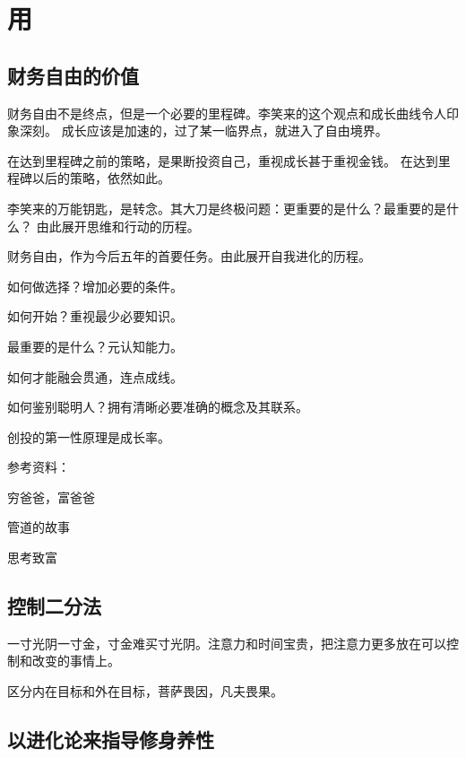 \section{用}

\subsection{财务自由的价值}

财务自由不是终点，但是一个必要的里程碑。李笑来的这个观点和成长曲线令人印象深刻。
成长应该是加速的，过了某一临界点，就进入了自由境界。

在达到里程碑之前的策略，是果断投资自己，重视成长甚于重视金钱。
在达到里程碑以后的策略，依然如此。

李笑来的万能钥匙，是转念。其大刀是终极问题：更重要的是什么？最重要的是什么？
由此展开思维和行动的历程。

财务自由，作为今后五年的首要任务。由此展开自我进化的历程。

\begin{enumbox}
\item 如何做选择？增加必要的条件。
\item 如何开始？重视最少必要知识。
\item 最重要的是什么？元认知能力。
\item 如何才能融会贯通，连点成线。
\item 如何鉴别聪明人？拥有清晰必要准确的概念及其联系。
\item 创投的第一性原理是成长率。
\end{enumbox}

参考资料：
\begin{enumbox}
\item 穷爸爸，富爸爸
\item 管道的故事
\item 思考致富
\end{enumbox}

\subsection{控制二分法}

一寸光阴一寸金，寸金难买寸光阴。注意力和时间宝贵，把注意力更多放在可以控制和改变的事情上。

区分内在目标和外在目标，菩萨畏因，凡夫畏果。

\subsection{以进化论来指导修身养性}

